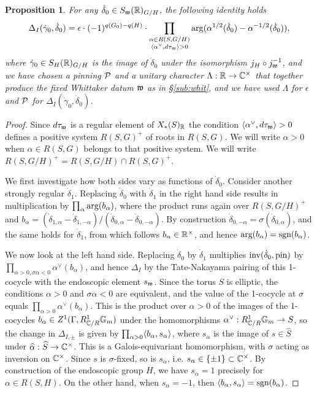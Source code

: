 \documentclass{article}
\newtheorem{pro}[thm]{Proposition}
\theoremstyle{definition}
\numberwithin{equation}{section}
\renewcommand{\-}{\hyp{}}
\begin{document}
\begin{pro} \label{pro:magic}
For any $\dot\delta_0 \in S_{\mathfrak{w}}(\mathbb{R})_{G/H}$, the following identity holds
\[  \Delta_{I}(\dot\gamma_0,\dot\delta_0) = \epsilon\cdot(-1)^{q(G_0)-q(H)}\cdot\prod_{\substack{\alpha \in R(S,G/H)\\ \langle\alpha^\vee,d\tau_{\mathfrak{w}}\rangle>0}}\arg(\alpha^{1/2}(\dot\delta_0) - \alpha^{-1/2}(\dot\delta_0)), \]
where $\dot\gamma_0 \in S_H(\mathbb{R})_{G/H}$ is the image of $\dot\delta_0$ under the isomorphism $j_H \circ j_{\mathfrak{w}}^{-1}$, and we have chosen a pinning $\mathcal{P}$ and a unitary character $\Lambda : \mathbb{R} \to \mathbb{C}^\times$ that together produce the fixed Whittaker datum $\mathfrak{w}$ as in \S\ref{sub:whit}, and we have used $\Lambda$ for $\epsilon$ and $\mathcal{P}$ for $\Delta_{I}(\dot\gamma_0,\dot\delta_0)$.
\end{pro}
\begin{proof}
Since $d\tau_{\mathfrak{w}}$ is a regular element of $X_*(S)_{\mathbb{R}}$ the condition $\langle\alpha^\vee,d\tau_{\mathfrak{w}}\rangle>0$ defines a positive system $R(S,G)^+$ of roots in $R(S,G)$. We will write $\alpha>0$ when $\alpha \in R(S,G)$ belongs to that positive system. We will write $R(S,G/H)^+ = R(S,G/H) \cap R(S,G)^+$.

	We first investigate how both sides vary as functions of $\dot\delta_0$. Consider another strongly regular $\dot\delta_1$. Replacing $\dot\delta_0$ with $\dot\delta_1$ in the right hand side results in multiplication by $\prod_\alpha \textrm{arg}(b_\alpha)$, where the product runs again over $R(S,G/H)^+$ and $b_\alpha=(\dot\delta_{1,\alpha}-\dot\delta_{1,-\alpha})/(\dot\delta_{0,\alpha}-\dot\delta_{0,-\alpha})$. By construction $\dot\delta_{0,-\alpha}=\sigma(\dot\delta_{0,\alpha})$, and the same holds for $\dot\delta_1$, from which follows $b_\alpha \in \mathbb{R}^\times$, and hence $\textrm{arg}(b_\alpha)=\textrm{sgn}(b_\alpha)$.

We now look at the left hand side. Replacing $\dot\delta_0$ by $\dot\delta_1$ multiplies $\textrm{inv}(\dot\delta_0,\textrm{pin})$ by $\prod_{\alpha>0,\sigma\alpha<0}\alpha^\vee(b_\alpha)$, and hence $\Delta_{I}$ by the Tate-Nakayama pairing of this 1-cocycle with the endoscopic element $s_{\mathfrak{w}}$. Since the torus $S$ is elliptic, the conditions $\alpha>0$ and $\sigma\alpha<0$ are equivalent, and the value of the 1-cocycle at $\sigma$ equals $\prod_{\alpha>0}\alpha^\vee(b_\alpha)$. This is the product over $\alpha>0$ of the images of the 1-cocycles $b_\alpha \in Z^1(\Gamma,R_{\mathbb{C}/R}^1\mathbb{G}_m)$ under the homomorphisms $\alpha^\vee : R_{\mathbb{C}/R}^1\mathbb{G}_m \to S$, so the change in $\Delta_{I,\pm}$ is given by $\prod_{\alpha>0}\langle b_\alpha,s_\alpha\rangle$, where $s_\alpha$ is the image of $s \in \hat S$ under $\widehat\alpha : \widehat S \to \mathbb{C}^\times$. This is a Galois-equivariant homomorphism, with $\sigma$ acting as inversion on $\mathbb{C}^\times$. Since $s$ is $\sigma$-fixed, so is $s_\alpha$, i.e. $s_\alpha \in \{\pm1\} \subset \mathbb{C}^\times$. By construction of the endoscopic group $H$, we have $s_\alpha=1$ precisely for $\alpha \in R(S,H)$. On the other hand, when $s_\alpha=-1$, then $\langle b_\alpha,s_\alpha\rangle=\textrm{sgn}(b_\alpha)$.


\end{proof}
\end{document}

